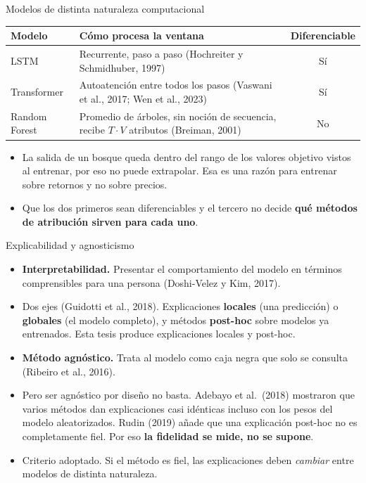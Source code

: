 \documentclass{beamer}
\begin{document}
\begin{frame}{Modelos de distinta naturaleza computacional}
    \small
    \begin{center}
    \renewcommand{\arraystretch}{1.25}
    \begin{tabular}{@{}p{2.7cm}p{4.6cm}c@{}}
    \toprule
    \textbf{Modelo} & \textbf{Cómo procesa la ventana} &
    \textbf{Diferenciable} \\
    \midrule
    LSTM & Recurrente, paso a paso (Hochreiter y Schmidhuber, 1997) & Sí \\
    Transformer & Autoatención entre todos los pasos (Vaswani et al., 2017;
    Wen et al., 2023) & Sí \\
    Random Forest & Promedio de árboles, sin noción de secuencia, recibe
    $T\cdot V$ atributos (Breiman, 2001) & No \\
    \bottomrule
    \end{tabular}
    \end{center}
    \vspace{0.2cm}
    \begin{itemize}
        \footnotesize
        \item La salida de un bosque queda dentro del rango de los
        valores objetivo vistos al entrenar, por eso no puede extrapolar.
        Esa es una razón para entrenar sobre retornos y no sobre precios.
        \item Que los dos primeros sean diferenciables y el tercero no
        decide \textbf{qué métodos de atribución sirven para cada uno}.
    \end{itemize}
\end{frame}

\begin{frame}{Explicabilidad y agnosticismo}
    \footnotesize
    \begin{itemize}
        \item \textbf{Interpretabilidad.} Presentar el comportamiento del
        modelo en términos comprensibles para una persona (Doshi-Velez y
        Kim, 2017).
        \item Dos ejes (Guidotti et al., 2018). Explicaciones
        \textbf{locales} (una predicción) o \textbf{globales} (el modelo
        completo), y métodos \textbf{post-hoc} sobre modelos ya entrenados.
        Esta tesis produce explicaciones locales y post-hoc.
        \item \textbf{Método agnóstico.} Trata al modelo como caja negra
        que solo se consulta (Ribeiro et al., 2016).
        \item Pero ser agnóstico por diseño no basta. Adebayo et al.\
        (2018) mostraron que varios métodos dan explicaciones casi
        idénticas incluso con los pesos del modelo aleatorizados.
        Rudin (2019) añade que una explicación post-hoc no es
        completamente fiel. Por eso \textbf{la fidelidad se mide, no se
        supone}.
        \item Criterio adoptado. Si el método es fiel, las explicaciones
        deben \emph{cambiar} entre modelos de distinta naturaleza.
    \end{itemize}
\end{frame}
\end{document}
